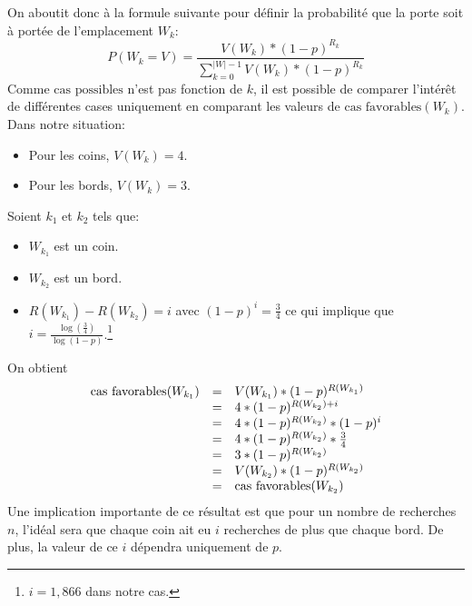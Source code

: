 \documentclass[a4paper,12pt]{article}
\begin{document}
On aboutit donc à la formule suivante pour définir la probabilité que la porte
soit à portée de l'emplacement $W_k$:
$$ P(W_k = V) = \frac{V(W_k) *(1-p)^{R_k}}{\sum\limits_{k=0}^{|W| - 1}{V(W_k) * (1-p) ^{R_k}}}$$
Comme $\text{cas possibles}$ n'est pas fonction de $k$, il est possible de
comparer l'intérêt de différentes cases uniquement en comparant les valeurs de
$\text{cas favorables}(W_k)$.
\\
Dans notre situation:
\begin{itemize}
\item Pour les coins, $V(W_k) = 4$.
\item Pour les bords, $V(W_k) = 3$.
\end{itemize}
Soient $k_1$ et $k_2$ tels que:
\begin{itemize}
\item $W_{k_1}$ est un coin.
\item $W_{k_2}$ est un bord.
\item $R(W_{k_1}) - R(W_{k_2}) = i$ avec $(1-p)^i = \frac{3}{4}$ ce qui implique
  que $i = \frac{\log(\frac{3}{4})}{\log(1-p)}$.\footnote{$i = 1,866$ dans notre
    cas.}
\end{itemize}
On obtient
$$\begin{array}{l c l}
\text{cas favorables}(W_{k_1})
&= &V(W_{k_1}) * (1-p)^{R(W_{k_1})}\\
&= &4 * (1-p)^{R(W_{k_2}) + i}\\
&= &4 * (1-p)^{R(W_{k_2})} * (1-p)^i\\
&= &4 * (1-p)^{R(W_{k_2})} * \frac{3}{4}\\
&= &3 * (1-p)^{R(W_{k_2})}\\
&= &V(W_{k_2}) * (1-p)^{R(W_{k_2})}\\
&= &\text{cas favorables}(W_{k_2})
\end{array}$$
Une implication importante de ce résultat est que pour un nombre de recherches
$n$, l'idéal sera que chaque coin ait eu $i$ recherches de plus que chaque bord.
De plus, la valeur de ce $i$ dépendra uniquement de $p$.
\end{document}

